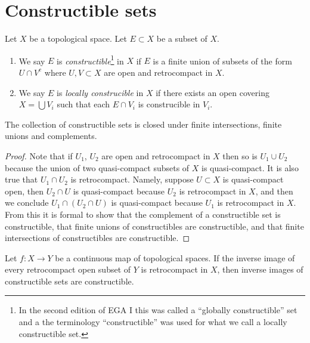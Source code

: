 \section{Constructible sets}
\label{section-constructible}

\begin{definition}
\label{definition-constructible}
Let $X$ be a topological space. Let $E \subset X$ be a subset of $X$.
\begin{enumerate}
\item We say $E$ is {\it constructible}\footnote{In the second edition
of EGA I \cite{EGA1-second} this was called a ``globally constructible''
set and a the terminology ``constructible'' was used for what we call a locally
constructible set.}
in $X$ if $E$ is a finite union
of subsets of the form $U \cap V^c$ where $U, V \subset X$ are open and
retrocompact in $X$.
\item We say $E$ is {\it locally construcible} in $X$ if there exists an open
covering $X = \bigcup V_i$ such that each $E \cap V_i$ is construcible
in $V_i$.
\end{enumerate}
\end{definition}

\begin{lemma}
\label{lemma-constructible}
The collection of constructible sets is closed under
finite intersections, finite unions and complements.
\end{lemma}

\begin{proof}
Note that if $U_1$, $U_2$ are open and retrocompact in $X$
then so is $U_1 \cup U_2$ because the union of two quasi-compact
subsets of $X$ is quasi-compact. It is also true that
$U_1 \cap U_2$ is retrocompact. Namely, suppose $U \subset X$
is quasi-compact open, then $U_2 \cap U$ is quasi-compact because
$U_2$ is retrocompact in $X$, and then we conclude
$U_1 \cap (U_2 \cap U)$ is quasi-compact because $U_1$ is
retrocompact in $X$. From this it is formal to show that
the complement of a constructible set is constructible,
that finite unions of constructibles are constructible, and
that finite intersections of constructibles are constructible.
\end{proof}

\begin{lemma}
\label{lemma-inverse-images-constructibles}
Let $f : X \to Y$ be a continuous map of topological spaces.
If the inverse image of every retrocompact open subset of $Y$
is retrocompact in $X$, then inverse images of constructible
sets are constructible.
\end{lemma}

